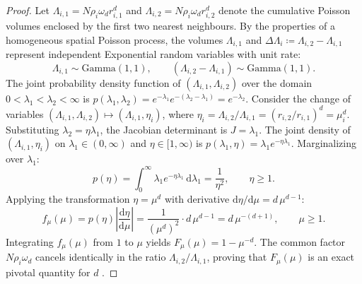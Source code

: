 \begin{proof}
  Let $\Lambda_{i,1} = N \rho_i \omega_d r_{i,1}^d$ and
  $\Lambda_{i,2} = N \rho_i \omega_d r_{i,2}^d$ denote the
  cumulative Poisson volumes enclosed by the first two nearest
  neighbours. By the properties of a homogeneous spatial Poisson
  process, the volumes $\Lambda_{i,1}$ and $\Delta \Lambda_i
  \coloneqq \Lambda_{i,2} - \Lambda_{i,1}$ represent independent
  Exponential random variables with unit rate:
  \begin{equation}
    \Lambda_{i,1} \sim \mathrm{Gamma}(1, 1), \qquad (\Lambda_{i,2} -
    \Lambda_{i,1}) \sim \mathrm{Gamma}(1, 1).
  \end{equation}
  The joint probability density function of $(\Lambda_{i,1},
  \Lambda_{i,2})$ over the domain $0 < \lambda_1 < \lambda_2 <
  \infty$ is $p(\lambda_1, \lambda_2) = e^{-\lambda_1}
  e^{-(\lambda_2 - \lambda_1)} = e^{-\lambda_2}$. Consider the
  change of variables $(\Lambda_{i,1}, \Lambda_{i,2}) \mapsto
  (\Lambda_{i,1}, \eta_i)$, where $\eta_i =
  \Lambda_{i,2}/\Lambda_{i,1} = (r_{i,2}/r_{i,1})^d = \mu_i^d$.
  Substituting $\lambda_2 = \eta \lambda_1$, the Jacobian
  determinant is $J = \lambda_1$. The joint density of
  $(\Lambda_{i,1}, \eta_i)$ on $\lambda_1 \in (0, \infty)$ and $\eta
  \in [1, \infty)$ is $p(\lambda_1, \eta) = \lambda_1 e^{-\eta
  \lambda_1}$. Marginalizing over $\lambda_1$:
  \begin{equation}
    p(\eta) = \int_0^\infty \lambda_1 e^{-\eta \lambda_1} \,
    \mathrm{d}\lambda_1 = \frac{1}{\eta^2}, \qquad \eta \ge 1.
  \end{equation}
  Applying the transformation $\eta = \mu^d$ with derivative
  $\mathrm{d}\eta/\mathrm{d}\mu = d \, \mu^{d-1}$:
  \begin{equation}
    f_\mu(\mu) = p(\eta) \left| \frac{\mathrm{d}\eta}{\mathrm{d}\mu}
    \right| = \frac{1}{(\mu^d)^2} \cdot d \, \mu^{d-1} = d \,
    \mu^{-(d+1)}, \qquad \mu \ge 1.
  \end{equation}
  Integrating $f_\mu(\mu)$ from $1$ to $\mu$ yields $F_\mu(\mu) = 1
  - \mu^{-d}$. The common factor $N \rho_i \omega_d$ cancels
  identically in the ratio $\Lambda_{i,2}/\Lambda_{i,1}$, proving
  that $F_\mu(\mu)$ is an exact pivotal quantity for $d$ \parencite{facco2017}.
\end{proof}

